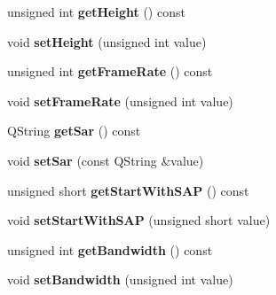 \begin{DoxyCompactItemize}
\item 
\hypertarget{class_representation_a9c4d00b24e4d114fe7494a65e359b91a}{unsigned int {\bfseries get\-Height} () const }\label{class_representation_a9c4d00b24e4d114fe7494a65e359b91a}

\item 
\hypertarget{class_representation_a0ce0ec235b15cafae7315d0ef7bfd3cb}{void {\bfseries set\-Height} (unsigned int value)}\label{class_representation_a0ce0ec235b15cafae7315d0ef7bfd3cb}

\item 
\hypertarget{class_representation_a3f1f8e04be3fdcf6dd04572d7f45a0f1}{unsigned int {\bfseries get\-Frame\-Rate} () const }\label{class_representation_a3f1f8e04be3fdcf6dd04572d7f45a0f1}

\item 
\hypertarget{class_representation_a886af686d0ca3a9d41d8f085eb969576}{void {\bfseries set\-Frame\-Rate} (unsigned int value)}\label{class_representation_a886af686d0ca3a9d41d8f085eb969576}

\item 
\hypertarget{class_representation_a594ecaac7de674fd2fd2c9fe9450ca54}{Q\-String {\bfseries get\-Sar} () const }\label{class_representation_a594ecaac7de674fd2fd2c9fe9450ca54}

\item 
\hypertarget{class_representation_a1489a1648b72387597d83c2c2d0d3870}{void {\bfseries set\-Sar} (const Q\-String \&value)}\label{class_representation_a1489a1648b72387597d83c2c2d0d3870}

\item 
\hypertarget{class_representation_a4d0dc6b4403e0c2ba1c9f1be9e431fec}{unsigned short {\bfseries get\-Start\-With\-S\-A\-P} () const }\label{class_representation_a4d0dc6b4403e0c2ba1c9f1be9e431fec}

\item 
\hypertarget{class_representation_a16ec43f250f1082f563b4bb05a0f4565}{void {\bfseries set\-Start\-With\-S\-A\-P} (unsigned short value)}\label{class_representation_a16ec43f250f1082f563b4bb05a0f4565}

\item 
\hypertarget{class_representation_ac0b5cf15746aea6cf43402c920124229}{unsigned int {\bfseries get\-Bandwidth} () const }\label{class_representation_ac0b5cf15746aea6cf43402c920124229}

\item 
\hypertarget{class_representation_a5b4f51f1fe3a8ee56995b732d3f240b7}{void {\bfseries set\-Bandwidth} (unsigned int value)}\label{class_representation_a5b4f51f1fe3a8ee56995b732d3f240b7}


\end{DoxyCompactItemize}
